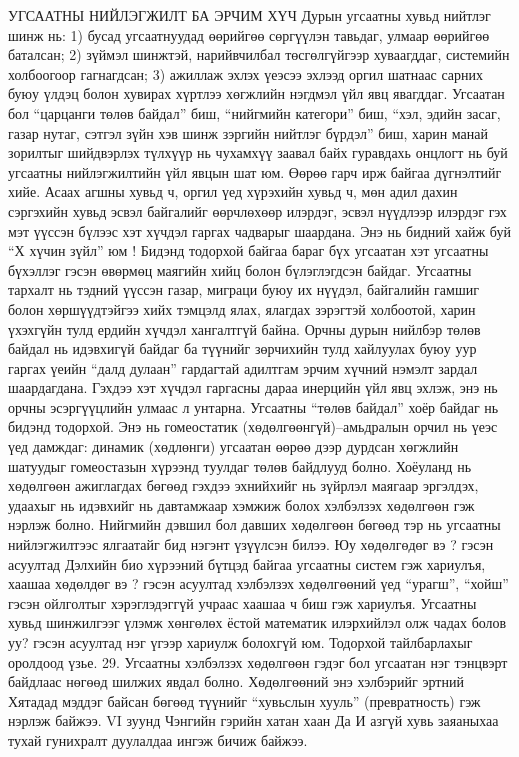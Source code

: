 УГСААТНЫ НИЙЛЭГЖИЛТ БА ЭРЧИМ ХҮЧ
Дурын угсаатны хувьд нийтлэг шинж нь: 1) бусад угсаатнуудад өөрийгөө сөргүүлэн тавьдаг, улмаар өөрийгөө баталсан; 2) зүймэл шинжтэй, нарийвчилбал төсгөлгүйгээр хуваагддаг, системийн холбоогоор гагнагдсан; 3) ажиллаж эхлэх үеэсээ эхлээд оргил шатнаас сарних буюу үлдэц болон хувирах хүртлээ хөгжлийн нэгдмэл үйл явц явагддаг. Угсаатан бол “царцанги төлөв байдал” биш, “нийгмийн категори” биш, “хэл, эдийн засаг, газар нутаг, сэтгэл зүйн хэв шинж зэргийн нийтлэг бүрдэл” биш, харин манай зорилтыг шийдвэрлэх түлхүүр нь чухамхүү заавал байх гуравдахь онцлогт нь буй угсаатны нийлэгжилтийн үйл явцын шат юм.
Өөрөө гарч ирж байгаа дүгнэлтийг хийе. Асаах агшны хувьд ч, оргил үед хүрэхийн хувьд ч, мөн адил дахин сэргэхийн хувьд эсвэл байгалийг өөрчлөхөөр илэрдэг, эсвэл нүүдлээр илэрдэг гэх мэт үүссэн бүлээс хэт хүчдэл гаргах чадварыг шаардана. Энэ нь бидний хайж буй “Х хүчин зүйл” юм ! Бидэнд тодорхой байгаа бараг бүх угсаатан хэт угсаатны бүхэллэг гэсэн өвөрмөц маягийн хийц болон бүлэглэгдсэн байдаг. Угсаатны тархалт нь тэдний үүссэн газар, миграци буюу их нүүдэл, байгалийн гамшиг болон хөршүүдтэйгээ хийх тэмцэлд ялах, ялагдах зэрэгтэй холбоотой, харин үхэхгүйн тулд ердийн хүчдэл хангалтгүй байна. Орчны дурын нийлбэр төлөв байдал нь идэвхигүй байдаг ба түүнийг зөрчихийн тулд хайлуулах буюу уур гаргах үеийн “далд дулаан” гардагтай адилтгам эрчим хүчний нэмэлт зардал шаардагдана. Гэхдээ хэт хүчдэл гаргасны дараа инерцийн үйл явц эхлэж, энэ нь орчны эсэргүүцлийн улмаас л унтарна.
Угсаатны “төлөв байдал” хоёр байдаг нь бидэнд тодорхой. Энэ нь гомеостатик (хөдөлгөөнгүй)–амьдралын орчил нь үеэс үед дамждаг: динамик (хөдлөнги) угсаатан өөрөө дээр дурдсан хөгжлийн шатуудыг гомеостазын хүрээнд туулдаг төлөв байдлууд болно. Хоёуланд нь хөдөлгөөн ажиглагдах бөгөөд гэхдээ эхнийхийг нь зүйрлэл маягаар эргэлдэх, удаахыг нь идэвхийг нь давтамжаар хэмжиж болох хэлбэлзэх хөдөлгөөн гэж нэрлэж болно. Нийгмийн дэвшил бол давших хөдөлгөөн бөгөөд тэр нь угсаатны нийлэгжилтээс ялгаатайг бид нэгэнт үзүүлсэн билээ.
Юу хөдөлгөдөг вэ ? гэсэн асуултад Дэлхийн био хүрээний бүтцэд байгаа угсаатны систем гэж хариулъя, хаашаа хөдөлдөг вэ ? гэсэн асуултад хэлбэлзэх хөдөлгөөний үед “урагш”, “хойш” гэсэн ойлголтыг хэрэглэдэггүй учраас хаашаа ч биш гэж хариулъя. Угсаатны хувьд шинжилгээг үлэмж хөнгөлөх ёстой математик илэрхийлэл олж чадах болов уу? гэсэн асуултад нэг үгээр хариулж болохгүй юм. Тодорхой тайлбарлахыг оролдоод үзье.
29. Угсаатны хэлбэлзэх хөдөлгөөн гэдэг бол угсаатан нэг тэнцвэрт байдлаас нөгөөд шилжих явдал болно. Хөдөлгөөний энэ хэлбэрийг эртний Хятадад мэддэг байсан бөгөөд түүнийг “хувьслын хууль” (превратность) гэж нэрлэж байжээ. VI зуунд Чэнгийн гэрийн хатан хаан Да И азгүй хувь заяаныхаа тухай гунихралт дуулалдаа ингэж бичиж байжээ.
